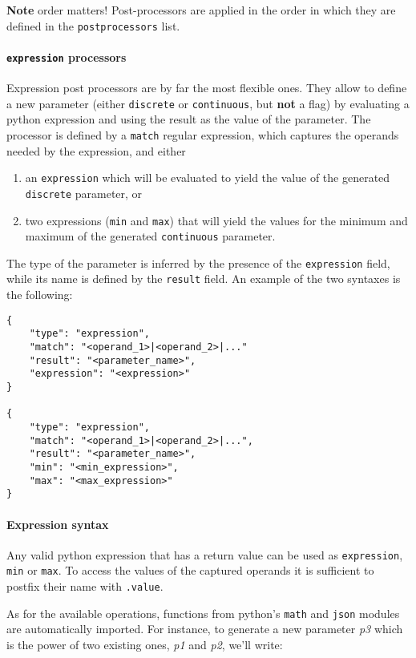 \documentclass[11pt,notitlepage,twoside,a4paper]{article}
\begin{document}
\begin{footnotesize}
\textbf{Note} order matters! Post-processors are applied in the order in
which they are defined in the \texttt{postprocessors} list.

\paragraph{\texttt{expression} processors}

Expression post processors are by far the most flexible ones. They allow
to define a new parameter (either \texttt{discrete} or
\texttt{continuous}, but \textbf{not} a flag) by evaluating a python
expression and using the result as the value of the parameter. The
processor is defined by a \texttt{match} regular expression, which
captures the operands needed by the expression, and either

\begin{enumerate}
\item
  an \texttt{expression} which will be evaluated to yield the value of
  the generated \texttt{discrete} parameter, or
\item
  two expressions (\texttt{min} and \texttt{max}) that will yield the
  values for the minimum and maximum of the generated
  \texttt{continuous} parameter.
\end{enumerate}

The type of the parameter is inferred by the presence of the
\texttt{expression} field, while its name is defined by the
\texttt{result} field. An example of the two syntaxes is the following:

\begin{lstlisting}
{
    "type": "expression",
    "match": "<operand_1>|<operand_2>|..."
    "result": "<parameter_name>",
    "expression": "<expression>"
}

{
    "type": "expression",
    "match": "<operand_1>|<operand_2>|...",
    "result": "<parameter_name>",
    "min": "<min_expression>",
    "max": "<max_expression>"
}
\end{lstlisting}

\paragraph{Expression syntax} Any valid python expression that has a return value can be used as
\texttt{expression}, \texttt{min} or \texttt{max}. To access the values
of the captured operands it is sufficient to postfix their name with
\texttt{.value}.

As for the available operations, functions from python's \texttt{math}
and \texttt{json} modules are automatically imported. For instance, to
generate a new parameter \emph{p3} which is the power of two existing
ones, \emph{p1} and \emph{p2}, we'll write:


\end{footnotesize}
\end{document}
